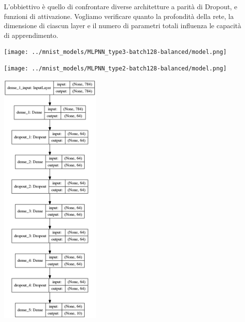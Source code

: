 \documentclass[12pt]{article}
\begin{document}
L'obbiettivo è quello di confrontare diverse architetture a parità
di Dropout, e funzioni di attivazione. 
Vogliamo verificare quanto la profondità della rete, la dimensione
di ciascun layer e il numero di parametri totali influenza le capacità di 
apprendimento.
 \newpage

\begin{multicols}{3}

    \noindent
    \begin{minipage}{\linewidth}
        \centering
        \texttt{[image: ../mnist\_models/MLPNN\_type3-batch128-balanced/model.png]}
        \label{fig:cc}
    \end{minipage}
    \bigskip

    \noindent
    \begin{minipage}{\linewidth}
        \centering
        \texttt{[image: ../mnist\_models/MLPNN\_type2-batch128-balanced/model.png]}
        \label{fig:cc}
    \end{minipage}
    \bigskip

    \noindent
    \begin{minipage}{\linewidth}
        \centering
        \includegraphics[width=5cm]{../mnist_models/MLPNN_type1-batch128-balanced/model.png}
        \label{fig:cc}
    \end{minipage}
    \bigskip



\end{multicols}
\end{document}
